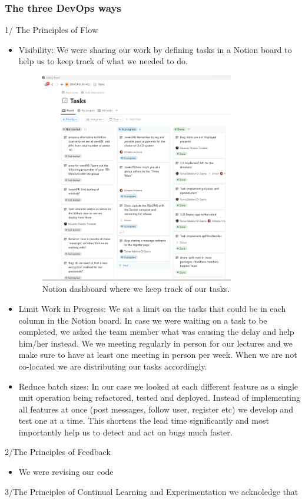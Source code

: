 \documentclass{article}
\begin{document}
\subsubsection{The three DevOps ways}
1/ The Principles of Flow
\begin{itemize}
    \item Visibility: We were sharing our work by defining tasks in a Notion board to help us to keep track of what we needed to do.

    \begin{figure}[ht]
        \centering
        \includegraphics[width=0.8\textwidth]{./images/notion-dashboard-visibility-three-ways.png}
        \caption{Notion dashboard where we keep track of our tasks.}
        \label{fig:notion-dashboard}
    \end{figure}

    \item Limit Work in Progress:
    We sat a limit on the tasks that could be in each column in the Notion board. In case we were waiting on a task to be completed, we asked the team member what was causing the delay and help him/her instead. We we meeting regularly in person for our lectures and we make sure to have at least one meeting in person per week. When we are not co-located we are distributing our tasks accordingly. 
    
    \item  Reduce batch sizes:
    In our case we looked at each different feature as a single unit operation being refactored, tested and deployed. Instead of implementing all features at once (post messages, follow user, register etc) we develop and test one at a time. This shortens the lead time significantly and most importantly help us to detect and act on bugs much faster.
\end{itemize}
2/The Principles of Feedback
\begin{itemize}
    \item We were revising our code 
\end{itemize}
3/The Principles of Continual Learning and Experimentation
we acknoledge that
\end{document}
